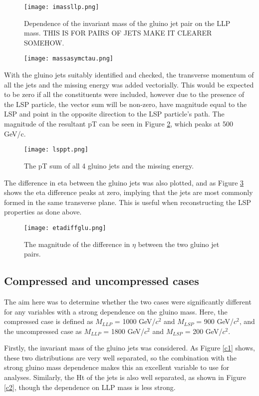 \documentclass{article}
\begin{document}
\begin{figure}[H]
\centering
\texttt{[image: imassllp.png]}
\caption{Dependence of the invariant mass of the gluino jet pair on the LLP mass. THIS IS FOR PAIRS OF JETS MAKE IT CLEARER SOMEHOW.}
	\label{im3}
\end{figure}

\begin{figure}[H]
\centering
\texttt{[image: massasymctau.png]}
\end{figure}

With the gluino jets suitably identified and checked, the transverse momentum of all the jets and the missing energy was added vectorially. This would be expected to be zero if all the constituents were included, however due to the presence of the LSP particle, the vector sum will be non-zero, have magnitude equal to the LSP and point in the opposite direction to the LSP particle's path. The magnitude of the resultant pT can be seen in Figure \ref{im4}, which peaks at 500 GeV/c. 

\begin{figure}[H]
\centering
\texttt{[image: lsppt.png]}
\caption{The pT sum of all 4 gluino jets and the missing energy.}
	\label{im4}
\end{figure}

The difference in eta between the gluino jets was also plotted, and as Figure \ref{im5} shows the eta difference peaks at zero, implying that the jets are most commonly formed in the same transverse plane. This is useful when reconstructing the LSP properties as done above.

\begin{figure}[H]
\centering
\texttt{[image: etadiffglu.png]}
\caption{The magnitude of the difference in $\eta$ between the two gluino jet pairs.}
	\label{im5}
\end{figure}

\subsection*{Compressed and uncompressed cases}
The aim here was to determine whether the two cases were significantly different for any variables with a strong dependence on the gluino mass. Here, the compressed case is defined as $M_{LLP}$ = 1000 GeV/$c^{2}$ and $M_{LSP}$ = 900 GeV/$c^{2}$, and the uncompressed case as $M_{LLP}$ = 1800 GeV/$c^{2}$ and $M_{LSP}$ = 200 GeV/$c^{2}$.

Firstly, the invariant mass of the gluino jets was considered. As Figure \ref{c1} shows, these two distributions are very well separated, so the combination with the strong gluino mass dependence makes this an excellent variable to use for analyses. Similarly, the Ht of the jets is also well separated, as shown in Figure \ref{c2}, though the dependence on LLP mass is less strong. 
\end{document}
